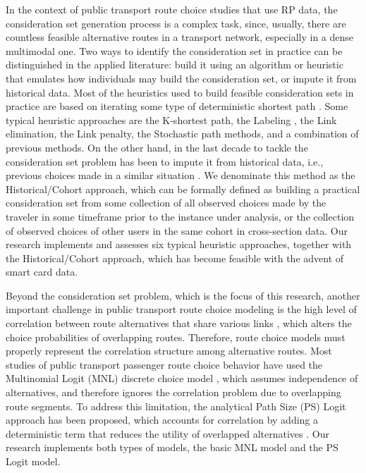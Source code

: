 \documentclass[12pt,a4paper]{article}
\begin{document}
In the context of public transport route choice studies that use RP data, the consideration set generation process is a complex task, since, usually, there are countless feasible alternative routes in a transport network, especially in a dense multimodal one. Two ways to identify the consideration set in practice can be distinguished in the applied literature: build it using an algorithm or heuristic that emulates how individuals may build the consideration set, or impute it from historical data. Most of the heuristics used to build feasible consideration sets in practice are based on iterating some type of deterministic shortest path \citep{prato2009route}. Some typical heuristic approaches are the K-shortest path, the Labeling \citep{ben1984modelling}, the Link elimination, the Link penalty, the Stochastic path methods, and a combination of previous methods. On the other hand, in the last decade to tackle the consideration set problem has been to impute it from historical data, i.e., previous choices made in a similar situation \citep{yap2020crowding, kim2019calibration, janovsikova2014estimation, raveau2011topological, raveau2014behavioural}. We denominate this method as the Historical/Cohort approach, which can be formally defined as building a practical consideration set from some collection of all observed choices made by the traveler in some timeframe prior to the instance under analysis, or the collection of observed choices of other users in the same cohort in cross-section data. Our research implements and assesses six typical heuristic approaches, together with the Historical/Cohort approach, which has become feasible with the advent of smart card data.

Beyond the consideration set problem, which is the focus of this research, another important challenge in public transport route choice modeling is the high level of correlation between route alternatives that share various links \citep[e.g.][]{prato2009route}, which alters the choice probabilities of overlapping routes. Therefore, route choice models must properly represent the correlation structure among alternative routes. Most studies of public transport passenger route choice behavior have used the Multinomial Logit (MNL) discrete choice model \citep{schmocker2013generation, nassir2018strategy, janovsikova2014estimation, kim2019calibration, grison2017users, guo2011mind, raveau2011topological, raveau2014behavioural, raveau2014analyzing, vrtic2002impact}, which assumes independence of alternatives, and therefore ignores the correlation problem due to overlapping route segments. To address this limitation, the analytical Path Size (PS) Logit approach has been proposed, which accounts for correlation by adding a deterministic term that reduces the utility of overlapped alternatives \citep{yap2020crowding, rui2016modeling, anderson2017multimodal, bovy2005modelling, de2012fixed, hoogendoorn2005path, nielsen2020relevance}. Our research implements both types of models, the basic MNL model and the PS Logit model.
\end{document}
